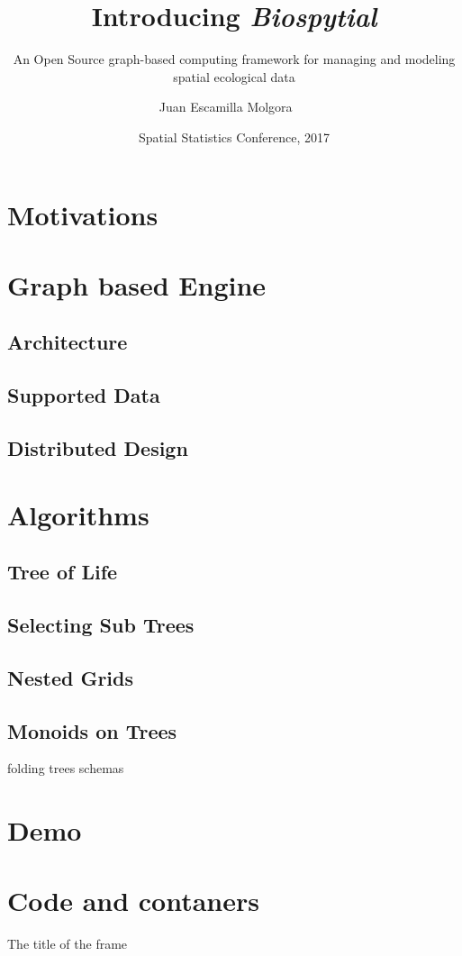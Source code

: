 \documentclass{beamer}
\title[Biospytial: a Graph Based Engine] %
{Introducing {\em Biospytial} }
\subtitle{An Open Source graph-based computing framework for managing and modeling spatial ecological data}
\author[Juan Escamilla Molgora] %
{Juan Escamilla Molgora~\inst{1} ~\inst{2}}
\institute[Lancaster University] %
{
  \inst{1}%
	Lancaster Environment Center
  \and
  \inst{2}%
  Data Science Institute
}
\date[SPAT2017] %
{Spatial Statistics Conference, 2017}
\begin{document}
\begin{frame}
\titlepage
\end{frame}

\section{Motivations}


\section{Graph based Engine}
\subsection{Architecture}
\subsection{Supported Data}
\subsection{Distributed Design}

\section{Algorithms}
\subsection{Tree of Life}
\subsection{Selecting Sub Trees}
\subsection{Nested Grids}
\subsection{Monoids on Trees}
folding trees
schemas

\section{Demo}
\section{Code and contaners}

\begin{frame}{The title of the frame}

\end{frame}
\end{document}
